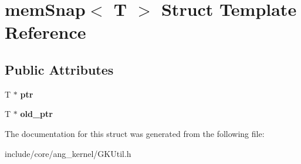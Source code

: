 \hypertarget{structmemSnap}{}\section{mem\+Snap$<$ T $>$ Struct Template Reference}
\label{structmemSnap}
\subsection*{Public Attributes}
\begin{DoxyCompactItemize}
\item 
T $\ast$ {\bfseries ptr}\hypertarget{structmemSnap_a1709cd3973352a5d5511cf03b6584813}{}\label{structmemSnap_a1709cd3973352a5d5511cf03b6584813}

\item 
T $\ast$ {\bfseries old\+\_\+ptr}\hypertarget{structmemSnap_a6ef816ef560a58ff29fcb9dc56b9a474}{}\label{structmemSnap_a6ef816ef560a58ff29fcb9dc56b9a474}

\end{DoxyCompactItemize}


The documentation for this struct was generated from the following file\+:\begin{DoxyCompactItemize}
\item 
include/core/ang\+\_\+kernel/G\+K\+Util.\+h\end{DoxyCompactItemize}
